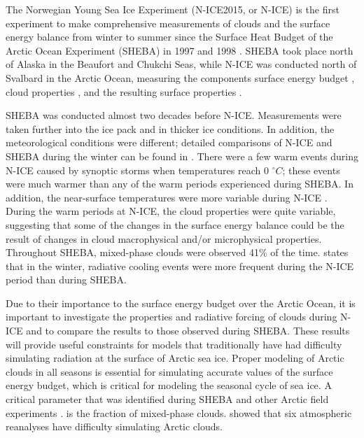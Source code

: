 The Norwegian Young Sea Ice Experiment (N-ICE2015, or N-ICE) \citep{granskog:2018} is the first experiment to make comprehensive measurements of clouds and the surface energy balance from winter to summer since the Surface Heat Budget of the Arctic Ocean Experiment (SHEBA) in 1997 and 1998 \citep{walden:2017, uttal:2002}. SHEBA took place north of Alaska in the Beaufort and Chukchi Seas, while N-ICE was conducted north of Svalbard in the Arctic Ocean, measuring the components surface energy budget \citep{persson:2002, andreas:2010, grachev:2007}, cloud properties \citep{turner:2005, turner:2002, intrieri:2002, shupe:2004}, and the resulting surface properties \citep{intrieri:2002, shupe:2004}. 

SHEBA was conducted almost two decades before N-ICE. Measurements were taken further into the ice pack \citep{cohen:2017} and in thicker ice conditions. In addition, the meteorological conditions were different; detailed comparisons of N-ICE and SHEBA during the winter can be found in \citep{graham:2017}. There were a few warm events during N-ICE caused by synoptic storms when temperatures reach 0 $^{\circ}C$; these events were much warmer than any of the warm periods experienced during SHEBA. In addition, the near-surface temperatures were more variable during N-ICE \citep{cohen:2017}. During the warm periods at N-ICE, the cloud properties were quite variable, suggesting that some of the changes in the surface energy balance could be the result of changes in cloud macrophysical and/or microphysical properties. Throughout SHEBA, mixed-phase clouds were observed 41$\%$ of the time. \citet{graham:2017} states that in the winter, radiative cooling events were more frequent during the N-ICE period than during SHEBA. 

Due to their importance to the surface energy budget over the Arctic Ocean, it is important to investigate the properties and radiative forcing of clouds during N-ICE and to compare the results to those observed during SHEBA. These results will provide useful constraints for models that traditionally have had difficulty simulating radiation at the surface of Arctic sea ice. Proper modeling of Arctic clouds in all seasons is essential for simulating accurate values of the surface energy budget, which is critical for modeling the seasonal cycle of sea ice. A critical parameter that was identified during SHEBA \citep{inoue:2008, tjernstrom:2005} and other Arctic field experiments \citep{hines:2017, listowski:2017, hines:2019}. is the fraction of mixed-phase clouds. \citet{graham:2017} showed that six atmospheric reanalyses have difficulty simulating Arctic clouds.

